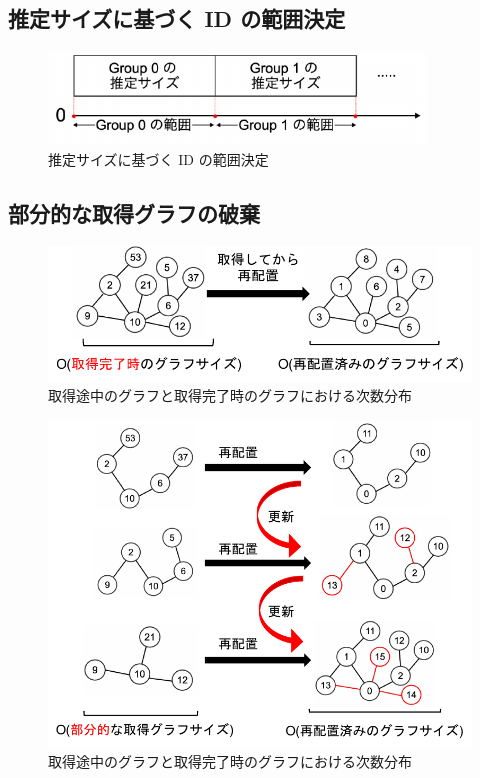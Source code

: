 \subsection{推定サイズに基づく ID の範囲決定}
\begin{figure}[t]
  \centering
  \includegraphics[width=10cm]{./figure/group_id_range.pdf}
  \caption{推定サイズに基づく ID の範囲決定}
  \label{degree_appro}
\end{figure}
\subsection{部分的な取得グラフの破棄}
\begin{figure}[t]
  \centering
  \includegraphics[width=\linewidth]{./figure/dbg-ee_bad_memory.pdf}
  \caption{取得途中のグラフと取得完了時のグラフにおける次数分布}
  \label{degree_appro}
\end{figure}
\begin{figure}[t]
  \centering
  \includegraphics[width=\linewidth]{./figure/dbg-ee_good_memory.pdf}
  \caption{取得途中のグラフと取得完了時のグラフにおける次数分布}
  \label{degree_appro}
\end{figure}
